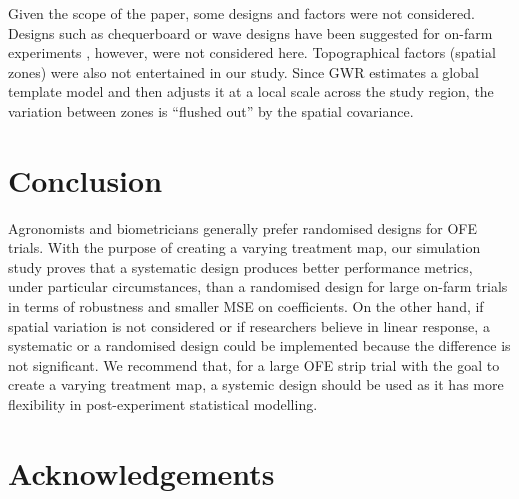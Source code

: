 \documentclass[a4paper]{article} 	%
\begin{document}
Given the scope of the paper, some designs and factors were not considered. Designs such as chequerboard or wave designs have been suggested for on-farm experiments \parencite{bramley1999designing}, however, were not considered here. Topographical factors (spatial zones) were also not entertained in our study. Since GWR estimates a global template model and then adjusts it at a local scale across the study region, the variation between zones is ``flushed out'' by the spatial covariance.



\section{Conclusion}\label{Sec:Conclusion}

Agronomists and biometricians generally prefer randomised designs for OFE trials. With the purpose of creating a varying treatment map, our simulation study proves that a systematic design produces better performance metrics, under particular circumstances, than a randomised design for large on-farm trials in terms of robustness and smaller MSE on coefficients. On the other hand, if spatial variation is not considered or if researchers believe in linear response, a systematic or a randomised design could be implemented because the difference is not significant. We recommend that, for a large OFE strip trial with the goal to create a varying treatment map, a systemic design should be used as it has more flexibility in post-experiment statistical modelling. 


\section*{Acknowledgements}
\end{document}
